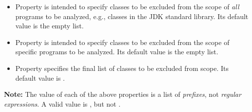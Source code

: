 \begin{itemize}
\item
Property  is intended to specify
classes to be excluded from the scope of {\it all} programs to be
analyzed, e.g., classes in the JDK standard library.  Its default
value is the empty list.
\item
Property  is intended to specify
classes to be excluded from the scope of specific programs to be
analyzed.  Its default value is the empty list.
\item
Property  specifies the final list of
classes to be excluded from scope.  Its default value is
.
\end{itemize}

{\bf Note:} The value of each of the above properties is a list of {\it prefixes},
not {\it regular expressions}.  A valid value is ,
but not .


